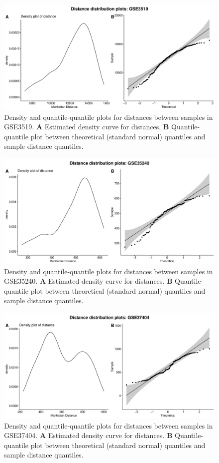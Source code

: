 \documentclass[10pt,letterpaper]{article}\usepackage[]{graphicx}\usepackage[]{color}
\begin{document}
\begin{figure}[H]
	\includegraphics[width=\textwidth]{manhattan-distance_hist_GSE3519.pdf}
	\caption{Density and quantile-quantile plots for distances between samples in GSE3519. \textbf{A} Estimated density curve for distances. \textbf{B} Quantile-quantile plot between theoretical (standard normal) quantiles and sample distance quantiles.}
\end{figure}

\begin{figure}[H]
	\includegraphics[width=\textwidth]{manhattan-distance_hist_GSE35240.pdf}
	\caption{Density and quantile-quantile plots for distances between samples in GSE35240. \textbf{A} Estimated density curve for distances. \textbf{B} Quantile-quantile plot between theoretical (standard normal) quantiles and sample distance quantiles.}
\end{figure}

\begin{figure}[H]
	\includegraphics[width=\textwidth]{manhattan-distance_hist_GSE37404.pdf}
	\caption{Density and quantile-quantile plots for distances between samples in GSE37404. \textbf{A} Estimated density curve for distances. \textbf{B} Quantile-quantile plot between theoretical (standard normal) quantiles and sample distance quantiles.}
\end{figure}
\end{document}
